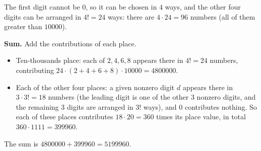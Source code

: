 The first digit cannot be $0$, so it can be chosen in $4$ ways, and the other four digits can be arranged in $4!=24$ ways: there are $4\cdot24=\boxed{96}$ numbers (all of them greater than $10000$).

\textbf{Sum.} Add the contributions of each place.
\begin{itemize}
\item Ten-thousands place: each of $2,4,6,8$ appears there in $4!=24$ numbers, contributing $24\cdot(2+4+6+8)\cdot10000=4800000$.
\item Each of the other four places: a given nonzero digit $d$ appears there in $3\cdot3!=18$ numbers (the leading digit is one of the other $3$ nonzero digits, and the remaining $3$ digits are arranged in $3!$ ways), and $0$ contributes nothing. So each of these places contributes $18\cdot20=360$ times its place value, in total $360\cdot1111=399960$.
\end{itemize}
The sum is $4800000+399960=\boxed{5199960}$.
